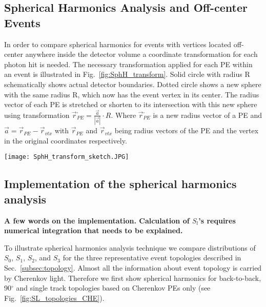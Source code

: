\subsection{Spherical Harmonics Analysis and Off-center Events}

In order to compare spherical harmonics for events with vertices located off-center anywhere inside the detector volume a coordinate transformation for each photon hit is needed. The necessary transformation applied for each PE within an event is illustrated in Fig.~\ref{fig:SphH_transform}. Solid circle with radius R schematically shows actual detector boundaries. Dotted circle shows a new sphere with the same radius R, which now has the event vertex in its center. The radius vector of each PE is stretched or shorten to its intersection with this new sphere using transformation $\vec{r}^{,}_{PE} = \frac{\vec{a}}{|\vec{a}|} \cdot R$. Where $\vec{r}^{,}_{PE}$ is a new radius vector of a PE and $\vec{a}=\vec{r}_{PE} - \vec{r}_{vtx}$ with $\vec{r}_{PE}$ and $\vec{r}_{vtx}$ being radius vectors of the PE and the vertex in the original coordinates respectively.

\begin{figure*}[h]
  \centering
  \texttt{[image: SphH\_transform\_sketch.JPG]}
  \caption{Coordinate transformation applied to events that are
    off-center. Solid circle schematically shows actual detector
    boundaries. Dotted circle shows a new sphere of radius R$=$6.5~m
    with the event vertex position in the center. The radius vector of
    each photon hit is stretched or shorten until intersection with
    this new sphere using transformation $\vec{r}^{,}_{hit} =
    \frac{\vec{a}}{|\vec{a}|} \cdot R$. Where $\vec{r}^{,}_{hit}$ is a
    new radius vector of the photon hit, $R$ is detector sphere radius,
    and $\vec{a}=\vec{r}_{hit} - \vec{r}_{vtx}$ with $\vec{r}_{hit}$
    and $\vec{r}_{vtx}$ being radius vectors of the photon hit and
    vertex position in original coordinates and correspondingly.}
  \label{fig:SphH_transform}
\end{figure*}


\subsection{Implementation of the spherical harmonics analysis}
{\bf A few words on the implementation. Calculation of $S_l$'s requires numerical integration that needs to be explained.}

To illustrate spherical harmonics analysis technique we compare distributions of $S_0$, $S_1$, $S_2$, and $S_3$ for the three representative event topologies described in Sec.~\ref{subsec:topology}. Almost all the information about event topology is carried by Cherenkov light. Therefore we first show spherical harmonics for back-to-back,  90$^{\circ}$ and single track topologies based on Cherenkov PEs only (see Fig.~\ref{fig:SL_topologies_CHE}).

